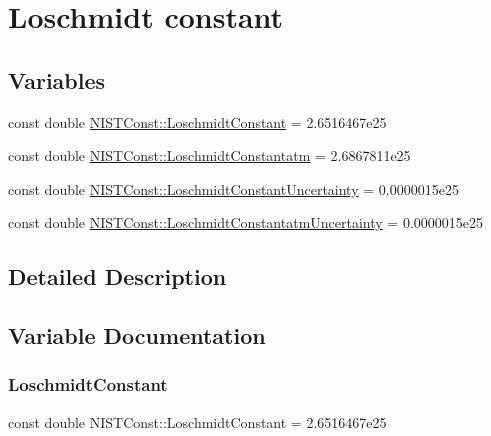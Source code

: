 \hypertarget{group___loschmidt_constant}{}\section{Loschmidt constant}
\label{group___loschmidt_constant}
\subsection*{Variables}
\begin{DoxyCompactItemize}
\item 
const double \hyperlink{group___loschmidt_constant_gab4ddc03e855109d251efa0ae9e8fb80d}{N\+I\+S\+T\+Const\+::\+Loschmidt\+Constant} = 2.\+6516467e25
\item 
const double \hyperlink{group___loschmidt_constant_ga1442f26c5c9f899f74ef7b546a41c461}{N\+I\+S\+T\+Const\+::\+Loschmidt\+Constantatm} = 2.\+6867811e25
\item 
const double \hyperlink{group___loschmidt_constant_gae1bf8845a08d0554f1045083a143c30a}{N\+I\+S\+T\+Const\+::\+Loschmidt\+Constant\+Uncertainty} = 0.\+0000015e25
\item 
const double \hyperlink{group___loschmidt_constant_gaed8885c8d2d27d9d8b88c271e0022228}{N\+I\+S\+T\+Const\+::\+Loschmidt\+Constantatm\+Uncertainty} = 0.\+0000015e25
\end{DoxyCompactItemize}


\subsection{Detailed Description}


\subsection{Variable Documentation}
\mbox{\label{group___loschmidt_constant_gab4ddc03e855109d251efa0ae9e8fb80d}} 
\subsubsection{\texorpdfstring{Loschmidt\+Constant}{LoschmidtConstant}}
{\footnotesize\ttfamily const double N\+I\+S\+T\+Const\+::\+Loschmidt\+Constant = 2.\+6516467e25}

